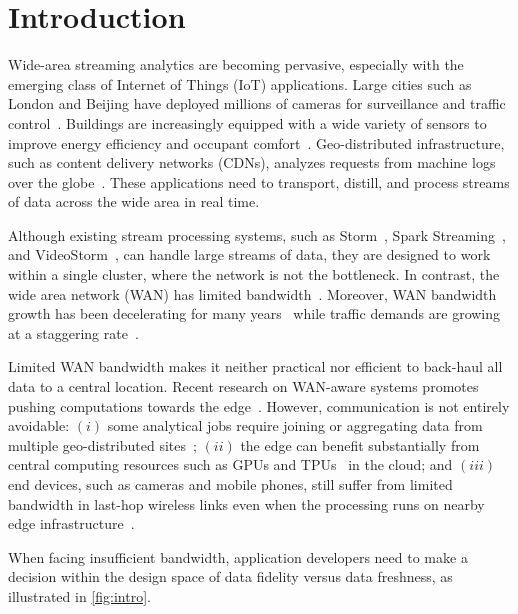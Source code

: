 \section{Introduction}

Wide-area streaming analytics are becoming pervasive, especially with the
emerging class of Internet of Things (IoT) applications.  Large cities such as
London and Beijing have deployed millions of cameras for surveillance and
traffic control~\cite{skynet, london.surveillance}. Buildings are increasingly
equipped with a wide variety of sensors to improve energy efficiency and
occupant comfort~\cite{krioukov2012building}. Geo-distributed infrastructure,
such as content delivery networks (CDNs), analyzes requests from machine logs
over the globe~\cite{mukerjee2015practical}. These applications need to
transport, distill, and process streams of data across the wide area in real
time.

Although existing stream processing systems, such as
Storm~\cite{toshniwal2014storm}, Spark Streaming~\cite{zaharia2013discretized},
and VideoStorm~\cite{zhang2017live}, can handle large streams of data, they are
designed to work within a single cluster, where the network is not the
bottleneck.  In contrast, the wide area network (WAN) has limited
bandwidth~\cite{hsieh17gaia, vulimiri2015global}.  Moreover, WAN bandwidth
growth has been decelerating for many years~\cite{global2016telegeography} while
traffic demands are growing at a staggering rate~\cite{index2013zettabyte}.

Limited WAN bandwidth makes it neither practical nor efficient to back-haul all
data to a central location.  Recent research on WAN-aware systems promotes
pushing computations towards the edge~\cite{rabkin2014aggregation,
  satyanarayanan2009case}. However, communication is not entirely avoidable:
$(i)$ some analytical jobs require joining or aggregating data from multiple
geo-distributed sites~\cite{pu2015low, viswanathan2016clarinet}; $(ii)$ the edge
can benefit substantially from central computing resources such as GPUs and
TPUs~\cite{abadi2016tensorflow} in the cloud; and $(iii)$ end devices, such as
cameras and mobile phones, still suffer from limited bandwidth in last-hop
wireless links even when the processing runs on nearby edge
infrastructure~\cite{abari2017enabling, zhang2015design}.

When facing insufficient bandwidth, application developers need to make a
decision within the design space of data fidelity versus data freshness, as
illustrated in \autoref{fig:intro}.

